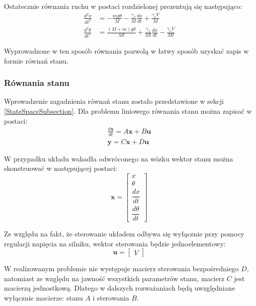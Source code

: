 \documentclass[12pt, oneside]{report}
\theoremstyle{definition}
\begin{document}
Ostatecznie równania ruchu w postaci rozdzielonej prezentują się następująco:
\begin{equation} \label{SimpleEquation}
\begin{aligned}
\frac{d^2x}{dt^2} &= -\frac{mg \theta}{M} - \frac{\gamma_f}{M} \frac{dx}{dt} + \frac{\gamma_v V}{M}\\
\frac{d^2\theta}{dt^2} &= \frac{(M+m)g\theta}{Ml} + \frac{\gamma_f}{Ml}\frac{dx}{dt} - \frac{\gamma_vV}{Ml}
\end{aligned}
\end{equation}

Wyprowadzone w ten sposób równania pozwolą w łatwy sposób uzyskać zapis w formie równań stanu.

\subsubsection{Równania stanu}
Wprowadzenie zagadnienia równań stanu zostało przedstawione w sekcji \ref{StateSpaceSubsection}. Dla problemu liniowego równania stanu można zapisać w postaci:
\begin{equation}
\begin{aligned}
\frac{d\mathbf{x}}{dt} = A\mathbf{x} + B\mathbf{u} \\
\mathbf{y} = C\mathbf{x} + D\mathbf{u}
\end{aligned}
\end{equation}

W przypadku układu wahadła odwróconego na wózku wektor stanu można skonstruować w następującej postaci:
\begin{equation}
\mathbf{x} = 
\begin{bmatrix}
x \\ 
\theta \\ 
\dfrac{dx}{dt} \\[8pt] 
\dfrac{d\theta}{dt}
\end{bmatrix}
\end{equation}

Ze względu na fakt, że sterowanie układem odbywa się wyłącznie przy pomocy regulacji napięcia na silniku, wektor sterowania będzie jednoelementowy:
\begin{equation}
\mathbf{u} = 
\begin{bmatrix}
V
\end{bmatrix}
\end{equation}

W realizowanym problemie nie występuje macierz sterowania bezpośredniego $D$, natomiast ze względu na jawność wszystkich parametrów stanu, macierz $C$ jest macierzą jednostkową. Dlatego w dalszych rozważaniach będą uwzględniane wyłącznie macierze: stanu $A$ i sterowania $B$.
\end{document}
